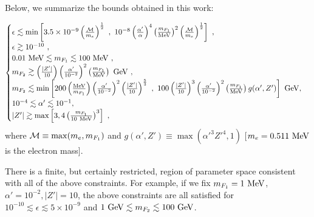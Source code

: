 \documentclass[12pt]{article}
\begin{document}
{{\newpage

Below, we summarize the bounds obtained in this work:

\begin{eqnarray}
\begin{cases}
\epsilon \lesssim \min \left [3.5 \times 10 ^{-9} \left ( \frac{{\cal M}}{m _e} \right ) ^{\frac{1}{2}} \ , \ 10 ^{-8} \left ( \frac{\alpha '}{\alpha} \right ) ^4 \left ( \frac{m _{F_1}}{\rm MeV} \right ) ^2 \left ( \frac{{\cal M}}{m _e} \right ) ^{\frac{1}{2}} \right ] \ , \\
\epsilon \gtrsim 10 ^{-10} \ , \\
0.01 \ {\rm MeV} \lesssim m _{F_1} \lesssim 100 \ {\rm MeV} \ , \\
m _{F_2} \gtrsim \left (\frac{|Z'|}{10} \right )\left (\frac{\alpha '}{10 ^{-2}} \right ) ^2\left ( \frac{m _{F_1}}{\rm MeV} \right ) \ {\rm GeV} \ , \\
m _{F_2} \lesssim \min \left [200 \left ( \frac{\rm MeV}{m _{F_1}} \right )\left ( \frac{\alpha '}{10 ^{-2}} \right ) ^2\left ( \frac{|Z'|}{10} \right ) ^{\frac{5}{3}} \ , \ 100 \left ( \frac{|Z'|}{10} \right ) ^3\left (\frac{\alpha '}{10 ^{-2}} \right ) ^2\left ( \frac{m _{F_1}}{\rm MeV} \right )g(\alpha ',Z') \right ] \ {\rm GeV} , \\
10 ^{-4} \lesssim \alpha ' \lesssim 10 ^{-1} , \\
|Z'| \gtrsim \max \left [ 3, 4 \left ( \frac{m _{F_1}}{10 \ \rm MeV} \right ) ^3 \right ] \ ,
\end{cases}
\label{boundsinterrelated}
\end{eqnarray}
%
where ${\cal M} \equiv \max ( m _e, m _{F_1} )$ and $g (\alpha ',Z') \equiv \max ({\alpha '} ^3{Z'} ^4,1)$ [$m _e = 0.511 \ {\rm MeV}$ is the electron mass].

There is a finite, but certainly restricted, region of parameter space consistent with all of the above constraints. For example, if we fix $m _{F_1} = 1 \ \rm  MeV$, $\alpha ' = 10 ^{-2}, |Z'|=10$, the above constraints are all satisfied for $10 ^{-10} \lesssim \epsilon \lesssim 5 \times 10 ^{-9}$ and $1 \ {\rm GeV} \lesssim m _{F_2} \lesssim 100 \ {\rm GeV}$.

}}
\end{document}
